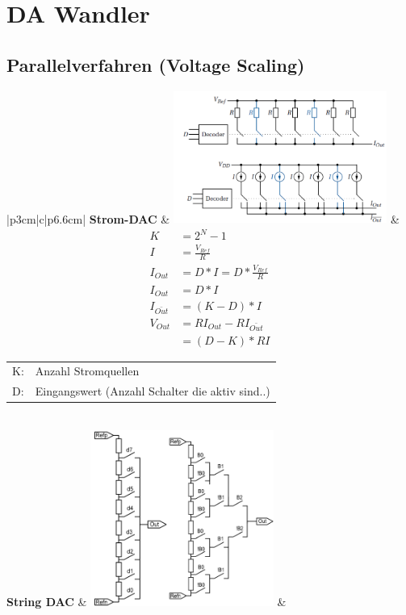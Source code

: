 \section{DA Wandler}

\subsection{Parallelverfahren (Voltage Scaling)}
\begin{longtable}{|p{3cm}|c|p{6.6cm}|}
	\hline
	\textbf{Strom-DAC} \hartl{456} 
	& \includegraphics[width=7cm, valign=t]{pictures/Strom-DAC}
	& {\begin{align*}
		K &=2^N-1\\
		I &=\frac{V_{Ref}}{R}\\
		I_{Out} &=D*I=D*\frac{V_{Ref}}{R}\\
		I_{Out} &=D*I\\
		I_{\bar{Out}} &=(K-D)*I\\
		V_{Out} &=RI_{Out}-RI_{\bar{Out}} \\
			    &=(D-K)*RI		
	  \end{align*}}
	  \begin{tabular}{lp{5cm}}
	  	K: & Anzahl Stromquellen \\
      	D: & Eingangswert (Anzahl Schalter die aktiv sind..)
      \end{tabular}
	\\ \hline
	\textbf{String DAC} 
	& \includegraphics[width=6cm, valign=t]{pictures/string_DAC}
	& \begin{description}

\end{description}
\end{longtable}
